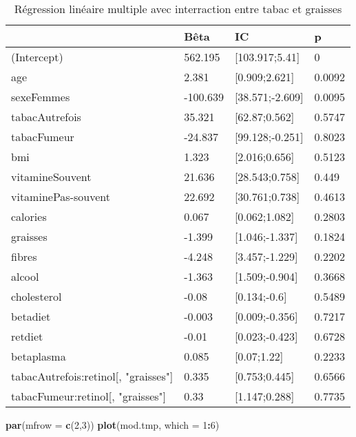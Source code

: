 \documentclass[]{article}
\newenvironment{Shaded}{\begin{snugshade}}{\end{snugshade}}
\newcommand{\KeywordTok}[1]{\textcolor[rgb]{0.13,0.29,0.53}{\textbf{#1}}}
\newcommand{\DataTypeTok}[1]{\textcolor[rgb]{0.13,0.29,0.53}{#1}}
\newcommand{\DecValTok}[1]{\textcolor[rgb]{0.00,0.00,0.81}{#1}}
\newcommand{\OperatorTok}[1]{\textcolor[rgb]{0.81,0.36,0.00}{\textbf{#1}}}
\newcommand{\NormalTok}[1]{#1}
\begin{document}
\begin{table}

\caption{\label{tab:unnamed-chunk-71}Régression linéaire multiple avec interraction entre tabac et graisses}
\centering
\begin{tabular}[t]{l|l|l|l}
\hline
  & Bêta & IC & p\\
\hline
\rowcolor[HTML]{BBD2E1}  (Intercept) & 562.195 & [103.917;5.41] & 0\\
\hline
age & 2.381 & [0.909;2.621] & 0.0092\\
\hline
\rowcolor[HTML]{BBD2E1}  sexeFemmes & -100.639 & [38.571;-2.609] & 0.0095\\
\hline
tabacAutrefois & 35.321 & [62.87;0.562] & 0.5747\\
\hline
\rowcolor[HTML]{BBD2E1}  tabacFumeur & -24.837 & [99.128;-0.251] & 0.8023\\
\hline
bmi & 1.323 & [2.016;0.656] & 0.5123\\
\hline
\rowcolor[HTML]{BBD2E1}  vitamineSouvent & 21.636 & [28.543;0.758] & 0.449\\
\hline
vitaminePas-souvent & 22.692 & [30.761;0.738] & 0.4613\\
\hline
\rowcolor[HTML]{BBD2E1}  calories & 0.067 & [0.062;1.082] & 0.2803\\
\hline
graisses & -1.399 & [1.046;-1.337] & 0.1824\\
\hline
\rowcolor[HTML]{BBD2E1}  fibres & -4.248 & [3.457;-1.229] & 0.2202\\
\hline
alcool & -1.363 & [1.509;-0.904] & 0.3668\\
\hline
\rowcolor[HTML]{BBD2E1}  cholesterol & -0.08 & [0.134;-0.6] & 0.5489\\
\hline
betadiet & -0.003 & [0.009;-0.356] & 0.7217\\
\hline
\rowcolor[HTML]{BBD2E1}  retdiet & -0.01 & [0.023;-0.423] & 0.6728\\
\hline
betaplasma & 0.085 & [0.07;1.22] & 0.2233\\
\hline
\rowcolor[HTML]{BBD2E1}  tabacAutrefois:retinol[, "graisses"] & 0.335 & [0.753;0.445] & 0.6566\\
\hline
tabacFumeur:retinol[, "graisses"] & 0.33 & [1.147;0.288] & 0.7735\\
\hline
\end{tabular}
\end{table}

\begin{Shaded}
\begin{Highlighting}[]
\KeywordTok{par}\NormalTok{(}\DataTypeTok{mfrow =} \KeywordTok{c}\NormalTok{(}\DecValTok{2}\NormalTok{,}\DecValTok{3}\NormalTok{))}
\KeywordTok{plot}\NormalTok{(mod.tmp, }\DataTypeTok{which =} \DecValTok{1}\OperatorTok{:}\DecValTok{6}\NormalTok{)}
\end{Highlighting}
\end{Shaded}
\end{document}
